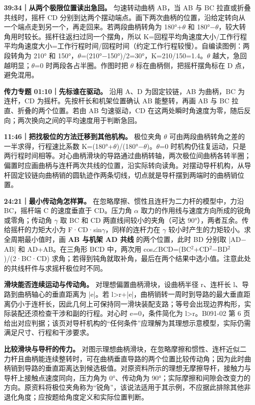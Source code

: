\documentclass[zihao=5,a4paper,UTF8,fontset=fandol]{ctexart}
\begin{document}
\textbf{39:34｜从两个极限位置读出急回。} 匀速转动曲柄 AB，当 AB 与 BC 拉直或折叠共线时，摇杆 CD 分别到达两个摆动端点。画下两次曲柄的位置，沿给定转向从一个端点走到另一个，再走回来。若两段曲柄转角为 180°+$\theta$ 和 180°$-$$\theta$，较大转角用时较长。摇杆往返扫过同一个摆角，所以 K=回程平均角速度大小/工作行程平均角速度大小=工作行程时间/回程时间（约定工作行程较慢）。自编读图例：两段转角为 210° 和 150°，$\theta$=(210°$-$150°)/2=30°，K=210/150=1.4。$\theta$ 越大，急回越明显；$\theta$=0 时两段各占半圈。作图时把 $\theta$ 标在曲柄侧，把摇杆摆角标在 D 点，避免混用。


\textbf{传力专题 01:10｜先标谁在驱动。} 沿用 A、D 为固定铰链，AB 为曲柄，BC 为连杆，CD 为摇杆。先按杆长和机架位置确认 AB 能整转，再画 AB 与 BC 拉直、折叠的两个位置。若由 AB 匀速驱动，CD 在这两处瞬时角速度为零，随后反向；两次换向之间的平均速度用于判断急回。


\textbf{11:46｜把找极位的方法迁移到其他机构。} 极位夹角 $\theta$ 可由两段曲柄转角之差的一半求得，行程速比系数 K=(180°+$\theta$)/(180°$-$$\theta$)。$\theta$=0 时机构仍往复运动，只是两行程时间相等。对心曲柄滑块的导路通过曲柄转轴，两次极位间曲柄各转半圈；偏置时应画曲柄与连杆两次共线的位置，沿实际转向读角。对摆动导杆机构，从导杆固定铰链向曲柄销的圆轨迹作两条切线，切点就是导杆摆到两端时的曲柄销位置。


\textbf{24:21｜最小传动角怎样算。} 在忽略摩擦、惯性且连杆为二力杆的模型中，力沿 BC，摇杆端 C 的速度垂直于 CD。压力角 $\alpha$ 取力的作用线与速度方向所成的锐角或零角；传动角 $\gamma$ 取 BC 和 CD 两直线间较小的夹角（可达 90°），两者互余。传给摇杆的力矩大小为 F·CD·sin$\gamma$，同样的连杆力在 $\gamma$ 较小时产生的力矩较小。求全周期最小值时，画 \textbf{AB 与机架 AD 共线} 的两个位置，此时 BD 分别取 |AD$-$AB| 和 AD+AB。在三角形 BCD 中，两次用 cos$\angle$BCD=(BC$^{2}$+CD$^{2}$$-$BD$^{2}$)/(2·BC·CD) 求角；若得到钝角就取补角，最后在两个结果中选小值。注意此处的共线杆件与求摇杆极位时不同。


\textbf{滑块能否连续运动与传动角。} 对理想偏置曲柄滑块，设曲柄半径 r、连杆长 l、导路到曲柄轴心的垂直距离为 |e|。若 l>r+|e|，曲柄销转一周时到导路的最大垂直距离仍小于连杆长，因此几何上可保持同一滑块装配支路；等号会出现边界构形，实际装配还须检查干涉和副的行程。对心时 e=0，条件简化为 l>r。B091-02 第 6 页给出对应判据；该页对导杆机构的“任何条件”应理解为其理想示意模型，实际仍需满足尺寸、行程和干涉要求。


\textbf{比较滑块与导杆的传力。} 对图示理想曲柄滑块，在忽略摩擦和惯性、连杆近似二力杆且曲柄能连续整转时，可在曲柄垂直导路的两个位置比较传动角；因为此时曲柄销到导路的垂直距离达到候选极值。对原资料所示的理想无摩擦导杆，接触力与导杆上接触点速度同向，压力角为 0°、传动角为 90°；实际摩擦和间隙会改变力的方向。原资料将极位夹角称为“锐角”，该说法适用于其示例，不应据此排除其他非退化角度；应按题给角度定义和实际位置判断。
\end{document}
